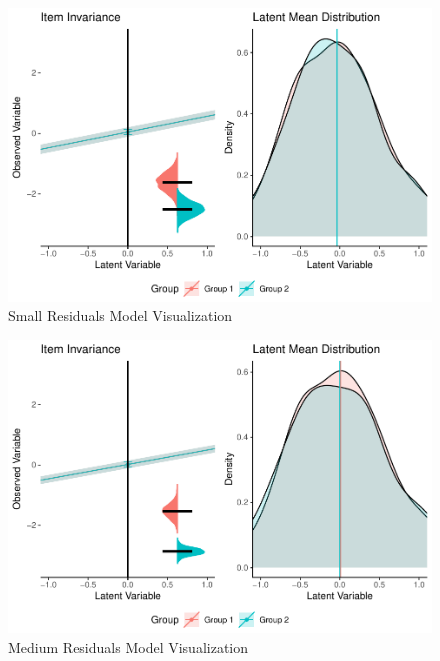 \documentclass[
  man]{apa6}
\begin{document}
\begin{figure}
\centering
\includegraphics{manuscript_files/figure-latex/small-res-pic-1.pdf}
\caption{\label{fig:small-res-pic}Small Residuals Model Visualization}
\end{figure}

\begin{figure}
\centering
\includegraphics{manuscript_files/figure-latex/med-res-pic-1.pdf}
\caption{\label{fig:med-res-pic}Medium Residuals Model Visualization}
\end{figure}
\end{document}
